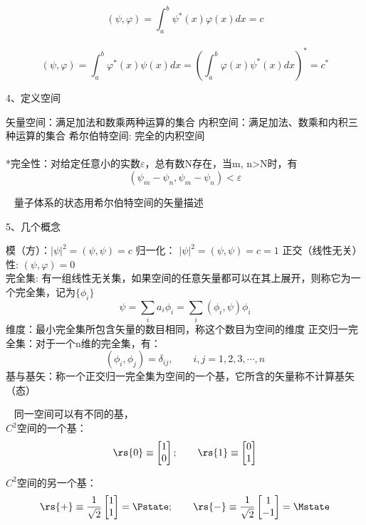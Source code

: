 \begin{frame} 
    \例 [2. 求定义在x空间的函数的内积]{}

    \解 ~ \[(\psi, \varphi)=\int_a ^b \psi^*(x)  \varphi(x) dx
    =c 
    \]
    ~ \[(\psi, \varphi)=\int_a ^b \varphi^*(x)\psi(x) dx = (\int_a ^b \varphi(x)\psi^*(x) dx) ^* =c^*\]
\end{frame} 

\begin{frame}
    4、定义空间\\
   \begin{itemize}
       \Item 矢量空间：满足加法和数乘两种运算的集合
       \Item 内积空间：满足加法、数乘和内积三种运算的集合
       \Item 希尔伯特空间:  完全的内积空间\\
       ~~ \\
       *完全性：对给定任意小的实数$\varepsilon$，总有数N存在，当m, n>N时，有\\
       $$ (\psi_m -\psi_n, \psi_m -\psi_n )< \varepsilon $$
   \end{itemize} 
   \Tips ~ 量子体系的状态用希尔伯特空间的矢量描述
\end{frame} 

\begin{frame}
    5、几个概念\\
   \begin{itemize}
       \Item 模（方）：$|\psi|^2= (\psi, \psi)=c$
       \Item 归一化： $|\psi|^2= (\psi, \psi)=c=1$
       \Item 正交（线性无关）性:  $(\psi, \varphi)=0 $ \\
       \Item 完全集: 有一组线性无关集，如果空间的任意矢量都可以在其上展开，则称它为一个完全集，记为$\{\phi_i\}$ 
       \[\psi=\sum_i a_i \phi_i= \sum_i (\phi_i,\psi) \phi_i\]
       \Item 维度：最小完全集所包含矢量的数目相同，称这个数目为空间的维度
       \Item 正交归一完全集：对于一个n维的完全集，有：\[(\phi_i,\phi_j)=\delta_{ij}, \qquad i,j=1,2,3,\cdots, n \]
       \Item 基与基矢：称一个正交归一完全集为空间的一个基，它所含的矢量称不计算基矢（态）
   \end{itemize} 
\end{frame} 

\begin{frame}
 \Tips~ 同一空间可以有不同的基，\\
 $C^2$空间的一个基：
 \[ \rs{0}\equiv\begin{bmatrix}
     1 \\
     0
 \end{bmatrix}; \qquad \rs{1}\equiv\begin{bmatrix}
    0 \\
    1
\end{bmatrix} \]

$C^2$空间的另一个基：
\[ \rs{+}\equiv\frac{1}{\sqrt{2}}\begin{bmatrix}
    1 \\
    1
\end{bmatrix}=\Pstate; \qquad \rs{-}\equiv\frac{1}{\sqrt{2}}\begin{bmatrix}
   1 \\
   -1
\end{bmatrix}=\Mstate \]

\end{frame} 

